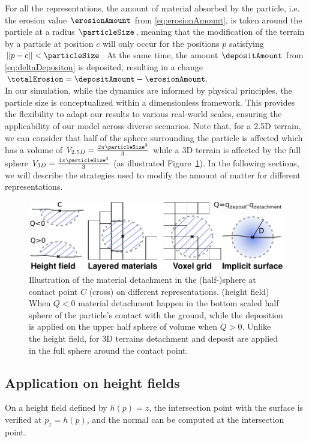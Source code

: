 For all the representations, the amount of material absorbed by the particle, i.e. the erosion value $\erosionAmount$ from \eqref{eq:erosionAmount}, is taken around the particle at a radius $\particleSize$, meaning that the modification of the terrain by a particle at position $c$ will only occur for the positions $p$ satisfying $||p - c|| < \particleSize$. At the same time, the amount $\depositAmount$ from \eqref{eq:deltaDepositon} is deposited, resulting in a change $\totalErosion = \depositAmount - \erosionAmount.$\\ 
In our simulation, while the dynamics are informed by physical principles, the particle size is conceptualized within a dimensionless framework. This provides the flexibility to adapt our results to various real-world scales, ensuring the applicability of our model across diverse scenarios.
Note that, for a 2.5D terrain, we can consider that half of the sphere surrounding the particle is affected which has a volume of $V_{2.5D} = \frac{2 \pi \particleSize^3}{3}$ while a 3D terrain is affected by the full sphere $V_{3D} = \frac{4 \pi \particleSize^3}{3}$ (as illustrated  Figure~\ref{Erosion-fig:erosion_heightfield}). In the following sections, we will describe the strategies used to modify the amount of matter for different representations. 
\begin{figure}
\centering
\includegraphics{a_erosion_deposition.pdf}
\caption{Illustration of the material detachment in the (half-)sphere at contact point $C$ (cross) on different representations. (height field) When $Q<0$ material detachment happen in the bottom scaled half sphere of the particle's contact with the ground, while the deposition is applied on the upper half sphere of volume when $Q>0$. Unlike the height field, for 3D terrains detachment and deposit are applied in the full sphere around the contact point.}
\label{Erosion-fig:erosion_heightfield}

\end{figure}
\subsection{Application on height fields}
\label{sec:application_on_heightmaps}
On a height field defined by $h(p) = z$, the intersection point with the surface is verified at $p_z = h(p)$, and the normal can be computed at the intersection point. 

